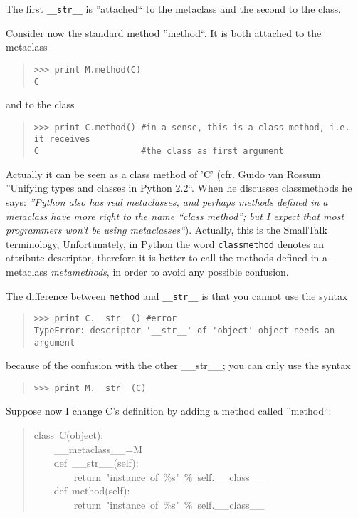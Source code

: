 \documentclass[10pt,english]{article}
\begin{document}
The first \texttt{{\_}{\_}str{\_}{\_}} is ''attached`` to the metaclass and the
second to the class.

Consider now the standard method ''method``. It is both attached to the
metaclass
\begin{quote}
\begin{verbatim}>>> print M.method(C)
C\end{verbatim}
\end{quote}

and to the class
\begin{quote}
\begin{verbatim}>>> print C.method() #in a sense, this is a class method, i.e. it receives 
C                    #the class as first argument\end{verbatim}
\end{quote}

Actually it can be seen as a class method of 'C' (cfr. Guido van Rossum
''Unifying types and classes in Python 2.2``. When he discusses
classmethods he says: \emph{''Python also has real metaclasses, and perhaps 
methods defined in a metaclass have more right to the name ``class method''; 
but I expect that most programmers won't be using metaclasses``}). Actually,
this is the SmallTalk terminology, Unfortunately, in Python the word
\texttt{classmethod} denotes an attribute descriptor, therefore it is better
to call the methods defined in a metaclass \emph{metamethods}, in order to avoid
any possible confusion.

The difference between \texttt{method} and \texttt{{\_}{\_}str{\_}{\_}} is that you cannot use the
syntax
\begin{quote}
\begin{verbatim}>>> print C.__str__() #error
TypeError: descriptor '__str__' of 'object' object needs an argument\end{verbatim}
\end{quote}

because of the confusion with the other {\_}{\_}str{\_}{\_}; you can only use the
syntax
\begin{quote}
\begin{verbatim}>>> print M.__str__(C)\end{verbatim}
\end{quote}

Suppose now I change C's definition by adding a method called ''method``:
\begin{quote}
\begin{ttfamily}\begin{flushleft}
\mbox{class~C(object):}\\
\mbox{~~~~{\_}{\_}metaclass{\_}{\_}=M}\\
\mbox{~~~~def~{\_}{\_}str{\_}{\_}(self):}\\
\mbox{~~~~~~~~return~"instance~of~{\%}s"~{\%}~self.{\_}{\_}class{\_}{\_}}\\
\mbox{~~~~def~method(self):}\\
\mbox{~~~~~~~~return~"instance~of~{\%}s"~{\%}~self.{\_}{\_}class{\_}{\_}}
\end{flushleft}\end{ttfamily}
\end{quote}
\end{document}
